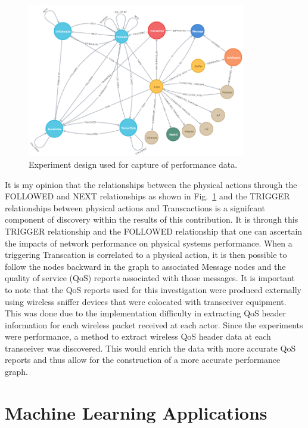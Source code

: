\begin{figure}[!ht]
	\centering
	\includegraphics[width=0.85\textwidth]{chapter-gdb-appl/figures/database/graph_schema_updated_2.png}
	\caption{Experiment design used for capture of performance data.}
	\label{fig:concl:data-physical-actions-following}
\end{figure}

It is my opinion that the relationships between the physical actions through the FOLLOWED and NEXT relationships as shown in Fig.~\ref{fig:concl:data-physical-actions-following} and the TRIGGER relationships between physical actions and Transcactions is a signifcant component of discovery within the results of this contribution. It is through this TRIGGER relationship and the FOLLOWED relationship that one can ascertain the impacts of network performance on physical systems performance.  When a triggering Transcation is correlated to a physical action, it is then possible to follow the nodes backward in the graph to associated Message nodes and the quality of service (QoS) reports associated with those messages.  It is important to note that the QoS reports used for this investigation were produced externally using wireless sniffer devices that were colocated with transceiver equipment.  This was done due to the implementation difficulty in extracting QoS header information for each wireless packet received at each actor.  Since the experiments were performance, a method to extract wireless QoS header data at each transceiver was discovered.  This would enrich the data with more accurate QoS reports and thus allow for the construction of a more accurate performance graph.

\section{Machine Learning Applications}


